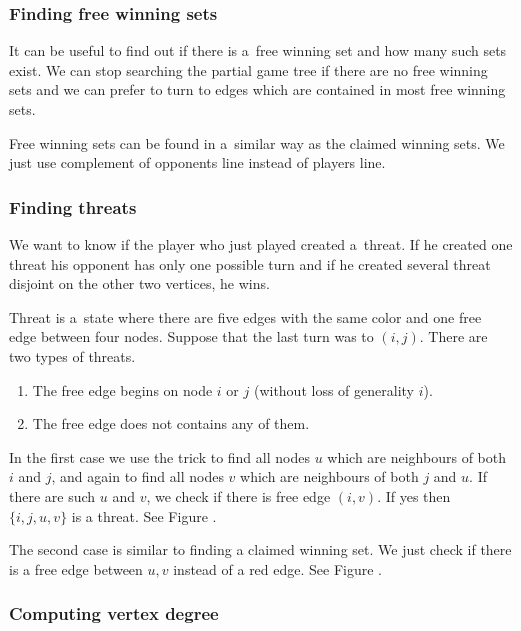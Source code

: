 \subsubsection{Finding free winning sets} \label{freeK4}

It can be useful to find out if there is a~free winning set 
and how many such sets exist. We can stop searching the partial game tree if
there are no free winning sets and we can prefer to turn to edges which are
contained in most free winning sets.

Free winning sets can be found in a~similar way as the claimed winning sets. We just 
use complement of opponents line instead of players line. 

\subsubsection{Finding threats}

We want to know if the player who just played created a~threat. If he created one
threat his opponent has only one possible turn and if he created several
threat disjoint on the other two vertices, he wins. 

Threat is a~state where there are five edges with the same color and one free edge
between four nodes. Suppose that the last turn was to $(i,j)$. There are two
types of threats.
 
\begin{enumerate} 
	\item The free edge begins on node $i$ or $j$ (without loss of generality $i$). 
	\item The free edge does not contains any of them.  
\end{enumerate}

In the first case we use the trick to find all nodes $u$ which are neighbours of both
$i$ and $j$, and again to find all nodes $v$ which are neighbours of
both $j$ and $u$. If there are such $u$ and $v$, we check if there is free edge
$(i,v)$. If yes then $\{i,j,u,v\}$ is a threat. See Figure .

The second case is similar to finding a claimed winning set. We just check if there is a free
edge between $u,v$ instead of a red edge. See Figure .

\subsubsection{Computing vertex degree}

